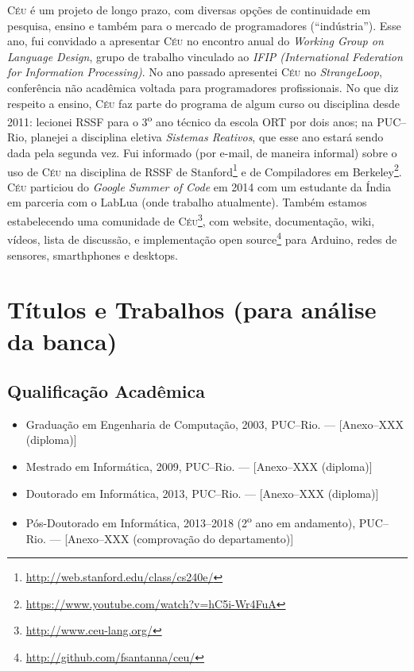 \documentclass[12pt,a4paper]{article}
\newcommand{\CEU}{\textsc{C\'{e}u}\xspace}
\begin{document}
\CEU é um projeto de longo prazo, com diversas opções de continuidade em 
pesquisa, ensino e também para o mercado de programadores (``indústria'').
%
Esse ano, fui convidado a apresentar \CEU no encontro anual do \emph{Working 
Group on Language Design}, grupo de trabalho vinculado ao \emph{IFIP 
(International Federation for Information Processing)}.
%
No ano passado apresentei \CEU no \emph{StrangeLoop}, conferência não acadêmica 
voltada para programadores profissionais.
%
No que diz respeito a ensino, \CEU faz parte do programa de algum curso ou 
disciplina desde 2011:
lecionei RSSF para o 3\textsuperscript{o} ano técnico da escola ORT por dois 
anos;
na PUC--Rio, planejei a disciplina eletiva \emph{Sistemas Reativos}, que esse 
ano
estará sendo dada pela segunda vez.
%
Fui informado (por e-mail, de maneira informal) sobre o uso de \CEU na 
disciplina de RSSF de 
Stanford\footnote{\url{http://web.stanford.edu/class/cs240e/}} e de 
Compiladores em 
Berkeley\footnote{\url{https://www.youtube.com/watch?v=hC5i-Wr4FuA}}.
%
\CEU particiou do \emph{Google Summer of Code} em 2014 com um estudante da 
Índia em parceria com o LabLua (onde trabalho atualmente).
%
Também estamos estabelecendo uma comunidade de 
\CEU\footnote{\url{http://www.ceu-lang.org/}}, com website,
documentação, wiki, vídeos, lista de discussão, e implementação open 
source\footnote{\url{http://github.com/fsantanna/ceu/}} para Arduino, redes de 
sensores, smarthphones e desktops.

\newpage
\section*{Títulos e Trabalhos (para análise da banca)}

\subsection*{Qualificação Acadêmica}

\begin{itemize}
\item
Graduação em Engenharia de Computação, 2003, PUC--Rio.
--- [Anexo--XXX (diploma)]
\item
Mestrado em Informática, 2009, PUC--Rio.
--- [Anexo--XXX (diploma)]
\item
Doutorado em Informática, 2013, PUC--Rio.
--- [Anexo--XXX (diploma)]
\item
Pós-Doutorado em Informática, 2013--2018 (2\textsuperscript{o} ano em 
andamento), PUC--Rio.
--- [Anexo--XXX (comprovação do departamento)]
\end{itemize}
\end{document}

